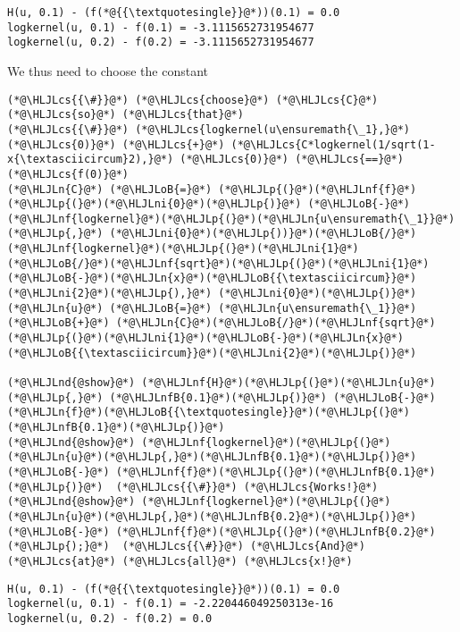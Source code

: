 \documentclass[12pt,landscape]{article}
\newcommand{\HLJLn}[1]{#1}
\newcommand{\HLJLnd}[1]{\textcolor[RGB]{214,102,97}{#1}}
\newcommand{\HLJLnf}[1]{\textcolor[RGB]{66,102,213}{#1}}
\newcommand{\HLJLnfB}[1]{\textcolor[RGB]{59,151,46}{#1}}
\newcommand{\HLJLni}[1]{\textcolor[RGB]{59,151,46}{#1}}
\newcommand{\HLJLoB}[1]{\textcolor[RGB]{102,102,102}{\textbf{#1}}}
\newcommand{\HLJLp}[1]{#1}
\newcommand{\HLJLcs}[1]{\textcolor[RGB]{153,153,119}{\textit{#1}}}
\begin{document}
{\begin{lstlisting}
H(u, 0.1) - (f(*@{{\textquotesingle}}@*))(0.1) = 0.0
logkernel(u, 0.1) - f(0.1) = -3.1115652731954677
logkernel(u, 0.2) - f(0.2) = -3.1115652731954677
\end{lstlisting}


We thus need to choose the constant


\begin{lstlisting}
(*@\HLJLcs{{\#}}@*) (*@\HLJLcs{choose}@*) (*@\HLJLcs{C}@*) (*@\HLJLcs{so}@*) (*@\HLJLcs{that}@*)
(*@\HLJLcs{{\#}}@*) (*@\HLJLcs{logkernel(u\ensuremath{\_1},}@*) (*@\HLJLcs{0)}@*) (*@\HLJLcs{+}@*) (*@\HLJLcs{C*logkernel(1/sqrt(1-x{\textasciicircum}2),}@*) (*@\HLJLcs{0)}@*) (*@\HLJLcs{==}@*) (*@\HLJLcs{f(0)}@*)
(*@\HLJLn{C}@*) (*@\HLJLoB{=}@*) (*@\HLJLp{(}@*)(*@\HLJLnf{f}@*)(*@\HLJLp{(}@*)(*@\HLJLni{0}@*)(*@\HLJLp{)}@*) (*@\HLJLoB{-}@*) (*@\HLJLnf{logkernel}@*)(*@\HLJLp{(}@*)(*@\HLJLn{u\ensuremath{\_1}}@*)(*@\HLJLp{,}@*) (*@\HLJLni{0}@*)(*@\HLJLp{))}@*)(*@\HLJLoB{/}@*)(*@\HLJLnf{logkernel}@*)(*@\HLJLp{(}@*)(*@\HLJLni{1}@*)(*@\HLJLoB{/}@*)(*@\HLJLnf{sqrt}@*)(*@\HLJLp{(}@*)(*@\HLJLni{1}@*)(*@\HLJLoB{-}@*)(*@\HLJLn{x}@*)(*@\HLJLoB{{\textasciicircum}}@*)(*@\HLJLni{2}@*)(*@\HLJLp{),}@*) (*@\HLJLni{0}@*)(*@\HLJLp{)}@*)
(*@\HLJLn{u}@*) (*@\HLJLoB{=}@*) (*@\HLJLn{u\ensuremath{\_1}}@*) (*@\HLJLoB{+}@*) (*@\HLJLn{C}@*)(*@\HLJLoB{/}@*)(*@\HLJLnf{sqrt}@*)(*@\HLJLp{(}@*)(*@\HLJLni{1}@*)(*@\HLJLoB{-}@*)(*@\HLJLn{x}@*)(*@\HLJLoB{{\textasciicircum}}@*)(*@\HLJLni{2}@*)(*@\HLJLp{)}@*)

(*@\HLJLnd{@show}@*) (*@\HLJLnf{H}@*)(*@\HLJLp{(}@*)(*@\HLJLn{u}@*)(*@\HLJLp{,}@*) (*@\HLJLnfB{0.1}@*)(*@\HLJLp{)}@*) (*@\HLJLoB{-}@*) (*@\HLJLn{f}@*)(*@\HLJLoB{{\textquotesingle}}@*)(*@\HLJLp{(}@*)(*@\HLJLnfB{0.1}@*)(*@\HLJLp{)}@*)
(*@\HLJLnd{@show}@*) (*@\HLJLnf{logkernel}@*)(*@\HLJLp{(}@*)(*@\HLJLn{u}@*)(*@\HLJLp{,}@*)(*@\HLJLnfB{0.1}@*)(*@\HLJLp{)}@*) (*@\HLJLoB{-}@*) (*@\HLJLnf{f}@*)(*@\HLJLp{(}@*)(*@\HLJLnfB{0.1}@*)(*@\HLJLp{)}@*)  (*@\HLJLcs{{\#}}@*) (*@\HLJLcs{Works!}@*)
(*@\HLJLnd{@show}@*) (*@\HLJLnf{logkernel}@*)(*@\HLJLp{(}@*)(*@\HLJLn{u}@*)(*@\HLJLp{,}@*)(*@\HLJLnfB{0.2}@*)(*@\HLJLp{)}@*) (*@\HLJLoB{-}@*) (*@\HLJLnf{f}@*)(*@\HLJLp{(}@*)(*@\HLJLnfB{0.2}@*)(*@\HLJLp{);}@*)  (*@\HLJLcs{{\#}}@*) (*@\HLJLcs{And}@*) (*@\HLJLcs{at}@*) (*@\HLJLcs{all}@*) (*@\HLJLcs{x!}@*)
\end{lstlisting}

\begin{lstlisting}
H(u, 0.1) - (f(*@{{\textquotesingle}}@*))(0.1) = 0.0
logkernel(u, 0.1) - f(0.1) = -2.220446049250313e-16
logkernel(u, 0.2) - f(0.2) = 0.0
\end{lstlisting}


}
\end{document}
